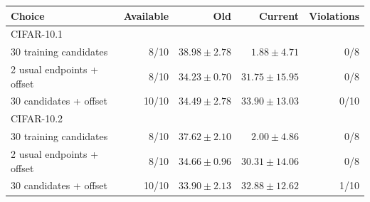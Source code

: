 \begin{tabular}{lrrrr}
\toprule
Choice & Available & Old & Current & Violations\\
\midrule
\multicolumn{5}{l}{CIFAR-10.1}\\
30 training candidates & 8/10 & $38.98\pm2.78$ & $1.88\pm4.71$ & 0/8\\
2 usual endpoints + offset & 8/10 & $34.23\pm0.70$ & $31.75\pm15.95$ & 0/8\\
30 candidates + offset & 10/10 & $34.49\pm2.78$ & $33.90\pm13.03$ & 0/10\\
\multicolumn{5}{l}{CIFAR-10.2}\\
30 training candidates & 8/10 & $37.62\pm2.10$ & $2.00\pm4.86$ & 0/8\\
2 usual endpoints + offset & 8/10 & $34.66\pm0.96$ & $30.31\pm14.06$ & 0/8\\
30 candidates + offset & 10/10 & $33.90\pm2.13$ & $32.88\pm12.62$ & 1/10\\
\bottomrule
\end{tabular}
